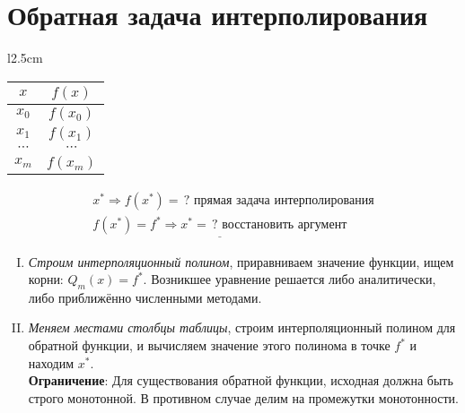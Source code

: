 \documentclass[a4paper,11pt]{article}
\begin{document}
\section{Обратная задача интерполирования}
\begin{minipage}{1\linewidth}
  \begin{wraptable}{l}{2.5cm}
    \begin{tabular}{ c|c }
      $x$ & $f(x)$ \\
      \hline
      $x_0$ & $f(x_0)$ \\
      $x_1$ & $f(x_1)$ \\
      $\cdots$ & $\cdots$ \\
      $x_m$ & $f(x_m)$
    \end{tabular}
  \end{wraptable}

  \begin{gather*}
    x^* \Rightarrow f(x^*) = \,? \text{ прямая задача интерполирования}\\
    \underline{f(x^*) = f^* \Rightarrow x^* = \,? \text{ восстановить аргумент}}
  \end{gather*}
\end{minipage}
\vspace{1cm}
\begin{enumerate}[I.]
  \item \textit{Строим интерполяционный полином}, приравниваем значение функции, ищем корни: $Q_m(x) = f^*$. Возникшее уравнение решается либо аналитически,
        либо приближённо численными методами.
  \item \textit{Меняем местами столбцы таблицы}, строим интерполяционный полином для обратной функции, и вычисляем значение этого полинома в точке $f^*$ и находим $x^*$. \\
  \textbf{Ограничение}: Для существования обратной функции, исходная должна быть строго монотонной. В противном случае делим на промежутки монотонности.
\end{enumerate}
\end{document}
